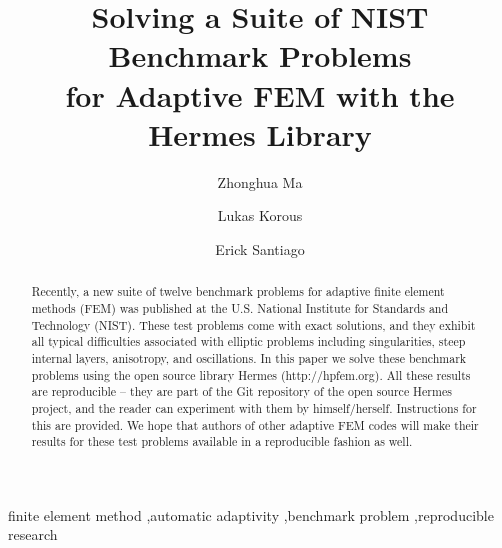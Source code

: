 \documentclass[12pt]{elsarticle}
\begin{document}
\begin{frontmatter}



\title{Solving a Suite of NIST Benchmark Problems\\ for Adaptive FEM with the Hermes Library}

\author[label1]{Zhonghua Ma}
\author[label2]{Lukas Korous}
\author[label3]{Erick Santiago}
\address[label1]{China University of Petroleum, Beijing, China}
\address[label2]{Charles University, Prague, Czech Republic}
\address[label3]{University of Nevada, Reno, USA}

\begin{abstract}
Recently, a new suite of twelve benchmark problems for adaptive finite element methods (FEM)
was published at the U.S. National Institute for Standards and Technology (NIST).
These test problems come with exact solutions, and they exhibit all typical difficulties
associated with elliptic problems including singularities, steep internal layers, anisotropy,
and oscillations. In this paper we solve these benchmark problems using the open source
library Hermes (http://hpfem.org). All these results are reproducible -- they are part of
the Git repository of the open source Hermes project, and the reader can experiment
with them by himself/herself. Instructions for this are provided. We hope that authors
of other adaptive FEM codes will make their results for these test problems available
in a reproducible fashion as well.
\end{abstract}

\begin{keyword}
finite element method \sep automatic adaptivity \sep benchmark problem \sep reproducible research
\end{keyword}

\end{frontmatter}
\end{document}
